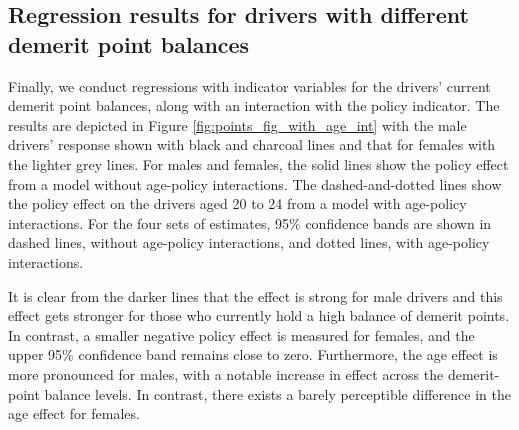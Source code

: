 \subsection{Regression results for drivers with different demerit point balances}
\label{sec:Empirical_w_pts_grp}

Finally, we conduct regressions with indicator variables 
for the drivers' current demerit point balances, 
along with an interaction with the policy indicator. 
% 
The results are depicted in Figure \ref{fig:points_fig_with_age_int}
with the male drivers' response shown with black and charcoal lines
and that for females with the lighter grey lines. 
For males and females, the solid lines show the policy effect 
from a model without age-policy interactions. 
The dashed-and-dotted lines show the policy effect 
on the drivers aged 20 to 24 from a model with age-policy interactions. 
For the four sets of estimates, 95\% confidence bands are shown in 
dashed lines, without age-policy interactions,
and dotted lines, with age-policy interactions.

It is clear from the darker lines 
that the effect is strong for male drivers and this effect gets stronger for 
those who currently hold a high balance of demerit points. 
In contrast, a smaller negative policy effect is measured for females, and the upper 95\% confidence band 
remains close to zero. 
Furthermore, the age effect is more pronounced for males, 
with a notable increase in effect across the demerit-point balance levels. 
In contrast, there exists a barely perceptible difference in the age effect for females. 




